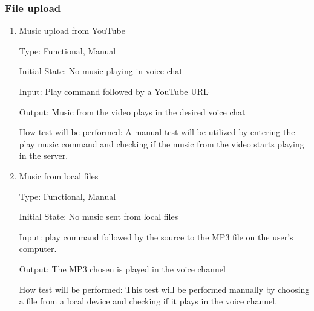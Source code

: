\documentclass[12pt, titlepage]{article}
\begin{document}
\subsubsection{File upload}
		

\begin{enumerate}

\item{Music upload from YouTube\\}

Type: Functional, Manual
					
Initial State: No music playing in voice chat
					
Input: Play command followed by a YouTube URL
					
Output: Music from the video plays in the desired voice chat
					
How test will be performed: A manual test will be utilized by entering the play music command and checking if the music from the video starts playing in the server.
					
\item{Music from local files\\}

Type: Functional, Manual
					
Initial State: No music sent from local files
					
Input: play command followed by the source to the MP3 file on the user's computer.
					
Output: The MP3 chosen is played in the voice channel
					
How test will be performed: This test will be performed manually by choosing a file from a local device and checking if it plays in the voice channel. 

\end{enumerate}
\end{document}
